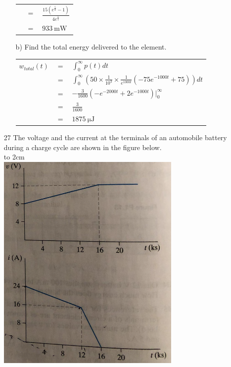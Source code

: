 \documentclass[a4paper]{article}
\begin{document}
\begin{itemize}
\begin{itemize}
\begin{tabular}{r c l}
		      	                      & $=$ & $\frac{15(e^{\frac{5}{8}} - 1)}{4e^{\frac{5}{4}}}$                                                      \\
		      	                      & $=$ & $\SI{933}{\milli\watt}$                                                                                 \\
		      \end{tabular}
		\item[b)] Find the total energy delivered to the element. \\
		      \begin{tabular}{r c l}
		      	$w_{total}(t)$ & $=$ & $\int_{0}^{\infty} p(t)dt$                                                                  \\
		      	               & $=$ & $\int_{0}^{\infty} (50\times\frac{1}{10^3}\times\frac{1}{e^{1000t}}(-75e^{-1000t} + 75))dt$ \\
		      	               & $=$ & $-\frac{3}{1600}(-e^{-2000t} + 2e^{-1000t})|_{0}^{\infty}$                                  \\
		      	               & $=$ & $\frac{3}{1600}$                                                                            \\
		      	               & $=$ & $\SI{1875}{\micro\joule}$                                                                   \\
		      \end{tabular} 
	\end{itemize}
	\item[27] The voltage and the current at the terminals of an automobile battery during a charge cycle are shown in the figure below. \\
	      \hbox to 2cm{} \\	  
	      \includegraphics{P1-27.png} \\  

\end{itemize}
\end{document}
